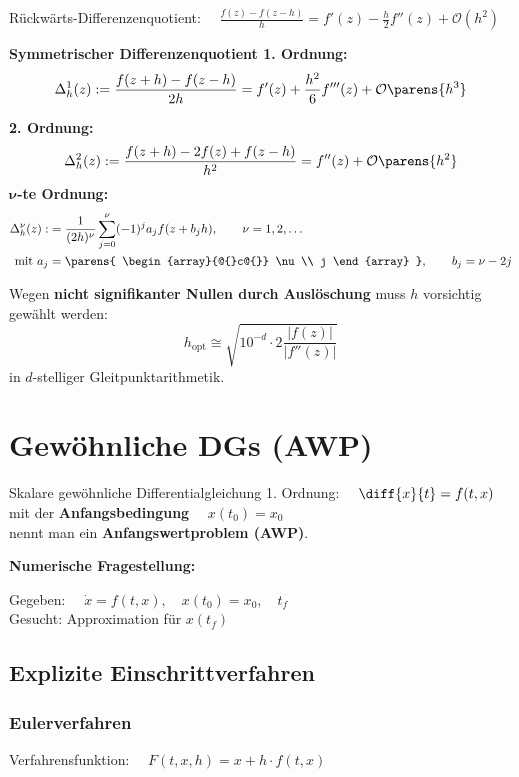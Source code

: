 		Rückwärts-Differenzenquotient: $\quad\displaystyle\frac{f(z)-f(z-h)}{h}= f'(z) - \frac{h}{2}f''(z) + \mathcal{O}\left( h^2\right)$
		
		\textbf{Symmetrischer Differenzenquotient 1. Ordnung:}
		\[
			\Delta_h^1(z):=\frac{f(z+h)-f(z-h)}{2h}= f'(z) + \frac{h^2}{6}f'''(z) + \mathcal{O} \parens{h^3}
		\]
		
		\textbf{2. Ordnung:}
		\[
			\Delta_h^2(z):=\frac{f(z+h)-2f(z)+f(z-h)}{h^2}= f''(z) + \mathcal{O} \parens{ h^2 }
		\]
		$\boldsymbol{\nu}$\textbf{-te Ordnung:}
		\begin{align*}
			\Delta_h^\nu(z):&= \frac{1}{(2h)^\nu}\sum\limits_{j=0}^\nu (-1)^ja_jf(z+b_jh) ,\qquad \nu = 1,2,\dots\\
			\text{mit } a_j &= \parens{
				\begin{array}{@{}c@{}}
					\nu \\
					j 
				\end{array}
			}, \qquad b_j = \nu-2j
		\end{align*}
		
		Wegen \textbf{nicht signifikanter Nullen durch Auslöschung} muss $h$ vorsichtig gewählt werden:
		\[
			h_\text{opt} \cong \sqrt{10^{-d}\cdot 2 \frac{|f(z)|}{|f''(z)|}}
		\]
		in $d$-stelliger Gleitpunktarithmetik.

\section{Gewöhnliche DGs (AWP)}
	Skalare gewöhnliche Differentialgleichung 1. Ordnung: $\quad \diff{x}{t} = f(t,x) $ \\
	mit der \textbf{Anfangsbedingung} $\quad x(t_0) = x_0$ \\
	nennt man ein \textbf{Anfangswertproblem (AWP)}.
	
	\textbf{Numerische Fragestellung:}
	
	Gegeben: $\quad \dot x = f(t,x), \quad x(t_0 ) = x_0, \quad t_f $ \\
	Gesucht: Approximation für $x(t_f)$
	
	\subsection{Explizite Einschrittverfahren} 
		\subsubsection{Eulerverfahren}
			Verfahrensfunktion: $\quad F(t,x,h) = x + h\cdot f(t,x)$

